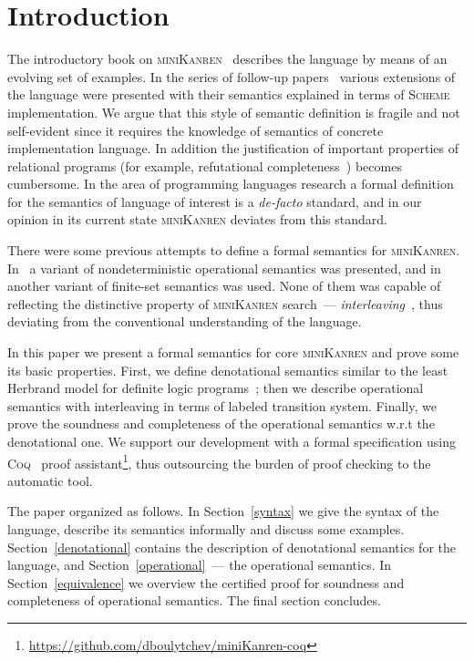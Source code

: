\section{Introduction}

The introductory book on \textsc{miniKanren}~\cite{TRS} describes the language by means of an evolving set of examples. In the
series of follow-up papers~\cite{MicroKanren,CKanren,CKanren1,AlphaKanren,2016,Guided} various extensions of the language were presented with
their semantics explained in terms of \textsc{Scheme} implementation. We argue that this style of semantic definition is
fragile and not self-evident since it requires the knowledge of semantics of concrete implementation language. In addition the justification of
important properties of relational programs (for example, refutational completeness~\cite{WillThesis}) becomes cumbersome. In the
area of programming languages research a formal definition for the semantics of language of interest is a \emph{de-facto} standard, and
in our opinion in its current state \textsc{miniKanren} deviates from this standard.

There were some previous attempts to define a formal semantics for \textsc{miniKanren}. In~\cite{RelConversion} a variant of nondeterministic
operational semantics was presented, and in~\cite{DivTest} another variant of finite-set semantics was used. None of them was capable of reflecting
the distinctive property of \textsc{miniKanren} search~--- \emph{interleaving}~\cite{Search}, thus deviating from the conventional understanding
of the language.

In this paper we present a formal semantics for core \textsc{miniKanren} and prove some its basic properties. First,
we define denotational semantics similar to the least Herbrand model for definite logic programs~\cite{LHM}; then
we describe operational semantics with interleaving in terms of labeled transition system. Finally, we prove the soundness and
completeness of the operational semantics w.r.t the denotational one. We support our development with a formal specification
using \textsc{Coq}~\cite{Coq} proof assistant\footnote{\url{https://github.com/dboulytchev/miniKanren-coq}}, thus outsourcing
the burden of proof checking to the automatic tool. 

The paper organized as follows. In Section~\ref{syntax} we give the syntax of the language, describe its semantics
informally and discuss some examples. Section~\ref{denotational} contains the description of denotational semantics for
the language, and Section~\ref{operational}~--- the operational semantics. In Section~\ref{equivalence} we overview the
certified proof for soundness and completeness of operational semantics. The final section concludes.


